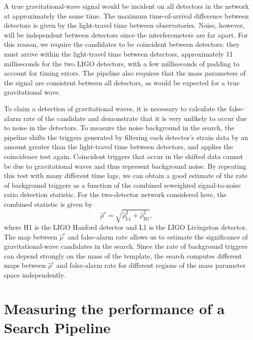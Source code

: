 A true gravitational-wave signal would be incident on all detectors in the network at
approximately the same time. The maximum time-of-arrival difference between
detectors is given by the light-travel time between observatories. Noise,
however, will be independent between detectors since the interferometers
are far apart. For this reason, we require the candidates to be coincident
between detectors: they must arrive within the light-travel time between detectors,
approximately 11 milliseconds for the two LIGO detectors, with
a few milliseconds of padding to account for timing errors. The pipeline also
requires that the mass parameters of the signal are consistent between all
detectors, as would be expected for a true gravitational wave. 

To claim a detection of gravitational waves, it is necessary to calculate the
false-alarm rate of the candidate and demonstrate that it is very unlikely to
occur due to noise in the detectors. To measure the noise background in the
search, the pipeline shifts the triggers generated by filtering each
detector's strain data by an amount greater than the light-travel time between
detectors, and applies the coincidence test again.  Coincident triggers that
occur in the shifted data cannot be due to gravitational waves and thus represent
background noise. By repeating this test with many different time lags, we can
obtain a good estimate of the rate of background triggers as a function of the
combined reweighted signal-to-noise ratio detection statistic. For the 
two-detector network considered here, the combined statistic is given by
%
\begin{equation}
\hat{\rho}^c = \sqrt{\hat{\rho}_\mathrm{L1}^2 + \hat{\rho}_\mathrm{H1}^2},
\end{equation}
%
where H1 is the LIGO Hanford detector and L1 is the LIGO Livingston detector. 
The map between $\hat{\rho}^c$ and false-alarm rate allows us to estimate the
significance of gravitational-wave candidates in the search. Since the rate of
background triggers can depend strongly on the mass of the template,
the search computes different maps between $\hat{\rho}^c$ and
false-alarm rate for different regions of the mass parameter space
independently. 

\section{Measuring the performance of a Search Pipeline}
\label{s:volume}

